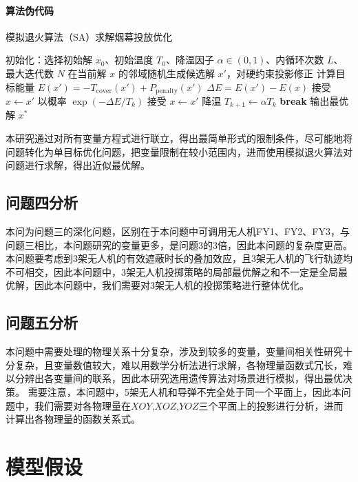 \documentclass{article}
\begin{document}
\paragraph{算法伪代码}
\begin{algorithm}[H]
\caption{模拟退火算法（SA）求解烟幕投放优化}
\begin{algorithmic}[1]
\State 初始化：选择初始解 $x_0$、初始温度 $T_0$、降温因子 $\alpha\in(0,1)$、内循环次数 $L$、最大迭代数 $N$
    \State 在当前解 $x$ 的邻域随机生成候选解 $x'$，对硬约束投影修正
    \State 计算目标能量 $E(x')=-T_{\mathrm{cover}}(x')+P_{\mathrm{penalty}}(x')$
    \State $\Delta E=E(x')-E(x)$
     接受 $x\leftarrow x'$
    \Else \State 以概率 $\exp(-\Delta E/T_k)$ 接受 $x\leftarrow x'$
    \EndIf
  \EndFor
  \State 降温 $T_{k+1}\leftarrow \alpha T_k$
   \textbf{break}
  \EndIf
\EndFor
\State 输出最优解 $x^*$
\end{algorithmic}
\end{algorithm}


本研究通过对所有变量方程式进行联立，得出最简单形式的限制条件，尽可能地将问题转化为单目标优化问题，把变量限制在较小范围内，进而使用模拟退火算法对问题进行求解，得出近似最优解。
\subsection{问题四分析}
本问为问题三的深化问题，区别在于本问题中可调用无人机FY1、FY2、FY3，与问题三相比，本问题研究的变量更多，是问题3的3倍，因此本问题的复杂度更高。
本问题要考虑到3架无人机的有效遮蔽时长的叠加效应，且3架无人机的飞行轨迹均不可相交，因此本问题中，3架无人机投掷策略的局部最优解之和不一定是全局最优解，因此本问题中，我们需要对3架无人机的投掷策略进行整体优化。

\subsection{问题五分析}
本问题中需要处理的物理关系十分复杂，涉及到较多的变量，变量间相关性研究十分复杂，且变量数值较大，难以用数学分析法进行求解，各物理量函数式冗长，难以分辨出各变量间的联系，因此本研究选用遗传算法对场景进行模拟，得出最优决策。
需要注意，本问题中，5架无人机和导弹不完全处于同一个平面上，因此本问题中，我们需要对各物理量在$XOY$,$XOZ$,$YOZ$三个平面上的投影进行分析，进而计算出各物理量的函数关系式。

\section{模型假设}
\end{document}
